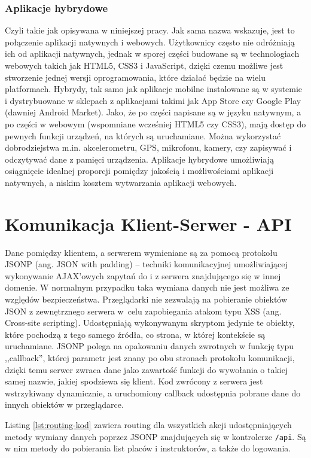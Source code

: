 \documentclass[twoside,a4paper,openright,12pt]{book}
\begin{document}
\subsubsection*{Aplikacje hybrydowe}
Czyli takie jak opisywana w niniejszej pracy. Jak sama nazwa wskazuje, jest to połączenie aplikacji natywnych i webowych. Użytkownicy często nie odróżniają ich od aplikacji natywnych, jednak w sporej części budowane są w technologiach webowych takich jak HTML5, CSS3 i JavaScript, dzięki czemu możliwe jest stworzenie jednej wersji oprogramowania, które działać będzie na wielu platformach. Hybrydy, tak samo jak aplikacje mobilne instalowane są w systemie i dystrybuowane w sklepach z aplikacjami takimi jak App Store czy Google Play (dawniej Android Market).
Jako, że po części napisane są w języku natywnym, a po części w webowym (wspomniane wcześniej HTML5 czy CSS3), mają dostęp do pewnych funkcji urządzeń, na których są uruchamiane. Można wykorzystać dobrodziejstwa m.in. akcelerometru, GPS, mikrofonu, kamery, czy zapisywać i odczytywać dane z pamięci urządzenia.
Aplikacje hybrydowe umożliwiają osiągnięcie idealnej proporcji pomiędzy jakością i możliwościami aplikacji natywnych, a niskim kosztem wytwarzania aplikacji webowych.


\section{Komunikacja Klient-Serwer - API}

Dane pomiędzy klientem, a serwerem wymieniane są za pomocą protokołu JSONP (ang. JSON with padding) -- techniki komunikacyjnej umożliwiającej wykonywanie AJAX'owych zapytań do i z serwera znajdującego się w innej domenie. W normalnym przypadku taka wymiana danych nie jest możliwa ze względów bezpieczeństwa. Przeglądarki nie zezwalają na pobieranie obiektów JSON z zewnętrznego serwera w~celu zapobiegania atakom typu XSS (ang. Cross-site scripting). Udostępniają wykonywanym skryptom jedynie te obiekty, które pochodzą z tego samego źródła, co strona, w której kontekście są uruchamiane. JSONP polega na opakowaniu danych zwrotnych w funkcję typu ,,callback'', której parametr jest znany po obu stronach protokołu komunikacji, dzięki temu serwer zwraca dane jako zawartość funkcji do wywołania o takiej samej nazwie, jakiej spodziewa się klient. Kod zwrócony z serwera jest wstrzykiwany dynamicznie, a uruchomiony callback udostępnia pobrane dane do innych obiektów w przeglądarce.

Listing \ref{lst:routing-kod} zawiera routing dla wszystkich akcji udostępniających metody wymiany danych poprzez JSONP znajdujących się w kontrolerze \texttt{/api}.
Są w nim metody do pobierania list placów i instruktorów, a także do logowania.
\end{document}
